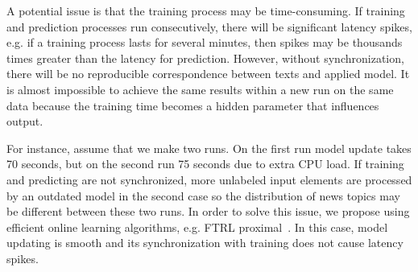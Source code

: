 A potential issue is that the training process may be time-consuming. If training and prediction processes run consecutively, there will be significant latency spikes, e.g. if a training process lasts for several minutes, then spikes may be thousands times greater than the latency for prediction. However, without synchronization, there will be no reproducible correspondence between texts and applied model. It is almost impossible to achieve the same results within a new run on the same data because the training time becomes a hidden parameter that influences output. 

For instance, assume that we make two runs. On the first run model update takes 70 seconds, but on the second run 75 seconds due to extra CPU load. If training and predicting are not synchronized, more unlabeled input elements are processed by an outdated model in the second case so the distribution of news topics may be different between these two runs. In order to solve this issue, we propose using efficient online learning algorithms, e.g. FTRL proximal~\cite{mcmahan2013ad}. In this case, model updating is smooth and its synchronization with training does not cause latency spikes.